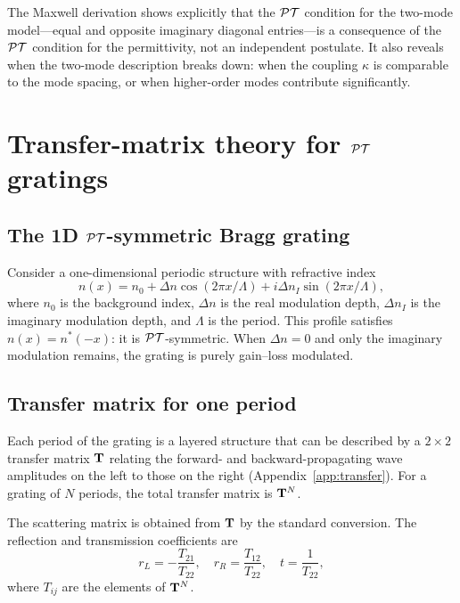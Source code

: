 The Maxwell derivation shows explicitly that the $\mathcal{PT}$ condition for the
two-mode model---equal and opposite imaginary diagonal entries---is a
consequence of the $\mathcal{PT}$ condition for the permittivity, not an
independent postulate. It also reveals when the two-mode description
breaks down: when the coupling $\kappa$ is comparable to the mode
spacing, or when higher-order modes contribute significantly.


\section{Transfer-matrix theory for $\mathcal{PT}$ gratings}
\label{sec:pt-transfer}

\subsection{The 1D $\mathcal{PT}$-symmetric Bragg grating}
\label{ssec:pt-bragg}

Consider a one-dimensional periodic structure with refractive index
\begin{equation}
 n(x) = n_0 + \Delta n\cos(2\pi x/\Lambda)
 + i\Delta n_I\sin(2\pi x/\Lambda),
 \label{eq:pt-grating-n}
\end{equation}
where $n_0$ is the background index, $\Delta n$ is the real modulation
depth, $\Delta n_I$ is the imaginary modulation depth, and $\Lambda$ is
the period. This profile satisfies $n(x) = n^*(-x)$: it is
$\mathcal{PT}$-symmetric. When $\Delta n = 0$ and only the imaginary modulation
remains, the grating is purely gain--loss modulated.

\subsection{Transfer matrix for one period}
\label{ssec:pt-transfer-matrix}

Each period of the grating is a layered structure that can be described
by a $2\times 2$ transfer matrix $\mathbf{T}$ relating the forward- and
backward-propagating wave amplitudes on the left to those on the right
(Appendix~\ref{app:transfer}). For a grating of $N$ periods, the total
transfer matrix is $\mathbf{T}^N$.

The scattering matrix is obtained from $\mathbf{T}$ by the standard conversion.
The reflection and transmission coefficients are~\cite{lin2011unidirectional}
\begin{equation}
 r_L = -\frac{T_{21}}{T_{22}}, \quad
 r_R = \frac{T_{12}}{T_{22}}, \quad
 t = \frac{1}{T_{22}},
 \label{eq:pt-transfer-to-scatter}
\end{equation}
where $T_{ij}$ are the elements of $\mathbf{T}^N$.

